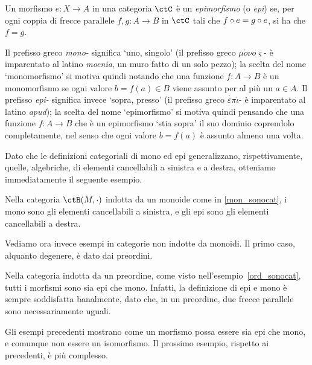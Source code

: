 \begin{definition}[Epimorfismo]\label{def_Epi}
	Un morfismo \(e \colon X \to A\) in una categoria \(\ctC\) è un \emph{epimorfismo} (o \emph{epi}) se,
	per ogni coppia di frecce parallele \(f, g \colon A \to B\) in \(\ctC\) tali che \(f \circ e = g \circ e\), si ha che \(f = g\).
\end{definition}
\begin{remark}
	Il prefisso greco \emph{mono-} significa `uno, singolo' (il prefisso greco \(\mu\acute{o}\nu o\varsigma\)- è imparentato al latino \emph{moenia}, un muro fatto di un solo pezzo); la scelta del nome `monomorfismo' si motiva quindi notando che una funzione \(f : A\to B\) è un monomorfismo se ogni valore \(b=f(a) \in B\) viene assunto per al più un \(a\in A\). Il prefisso \emph{epi-} significa invece `sopra, presso' (il prefisso greco \(\overset,\varepsilon\pi\acute{\iota}\)- è imparentato al latino \emph{apud}); la scelta del nome `epimorfismo' si motiva quindi pensando che una funzione \(f : A\to B\) che è un epimorfismo `stia sopra' il suo dominio coprendolo completamente, nel senso che ogni valore \(b=f(a)\) è assunto almeno una volta.
\end{remark}
Dato che le definizioni categoriali di mono ed epi generalizzano, rispettivamente, quelle, algebriche, di elementi cancellabili a sinistra e a destra, otteniamo immediatamente il seguente esempio.
\begin{example}
	Nella categoria \(\ctB(M,\cdot)\) indotta da un monoide come in \ref{mon_sonocat}, i mono sono gli elementi cancellabili a sinistra,
	e gli epi sono gli elementi cancellabili a destra.
\end{example}

Vediamo ora invece esempi in categorie non indotte da monoidi.
Il primo caso, alquanto degenere, è dato dai preordini.

\begin{example}
	Nella categoria indotta da un preordine, come visto nell'esempio~\ref{ord_sonocat},
	tutti i morfismi sono sia epi che mono.
	Infatti, la definizione di epi e mono è sempre soddisfatta banalmente,
	dato che, in un preordine, due frecce parallele sono necessariamente uguali.
\end{example}

Gli esempi precedenti mostrano come
un morfismo possa essere sia epi che mono, e comunque non essere un isomorfismo.
Il prossimo esempio, rispetto ai precedenti, è più complesso.

